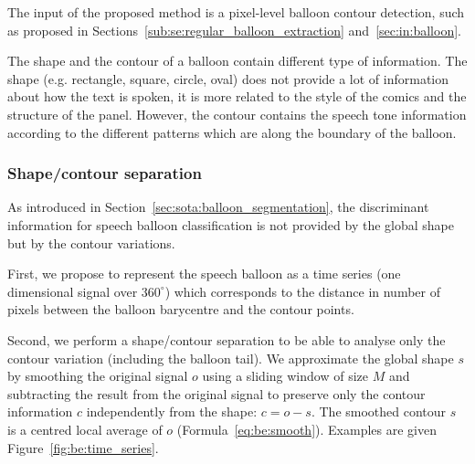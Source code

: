 The input of the proposed method is a pixel-level balloon contour detection, such as proposed in Sections~\ref{sub:se:regular_balloon_extraction} and~\ref{sec:in:balloon}.

The shape and the contour of a balloon contain different type of information.
The shape (e.g. rectangle, square, circle, oval) does not provide a lot of information about how the text is spoken, it is more related to the style of the comics and the structure of the panel.
However, the contour contains the speech tone information according to the different patterns which are along the boundary of the balloon.




\subsubsection{Shape/contour separation}
\label{sec:contour_detection}
As introduced in Section~\ref{sec:sota:balloon_segmentation}, the discriminant information for speech balloon classification is not provided by the global shape but by the contour variations. 

First, we propose to represent the speech balloon as a time series (one dimensional signal over $360^\circ$) which corresponds to the distance in number of pixels between the balloon barycentre and the contour points. 

Second, we perform a shape/contour separation to be able to analyse only the contour variation (including the balloon tail). We approximate the global shape $s$ by smoothing the original signal $o$ using a sliding window of size $M$ and subtracting the result from the original signal to preserve only the contour information $c$ independently from the shape: $c = o - s$. The smoothed contour $s$ is a centred local average of $o$ (Formula~\ref{eq:be:smooth}).
Examples are given Figure~\ref{fig:be:time_series}.


